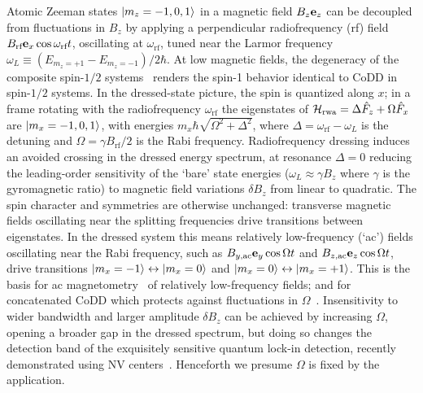 \documentclass[aps,prl,reprint,superscriptaddress,floatfix]{revtex4-1}
\begin{document}
Atomic Zeeman states $\vert m_z=-1,0,1 \rangle $ in a magnetic field $B_z \mathbf{e}_z$ can be decoupled from fluctuations in $B_z$ by applying a perpendicular radiofrequency (rf) field $B_{\text{rf}} \mathbf{e}_x \cos \omega_\text{rf} t$, oscillating at $\omega_\text{rf}$, tuned near the Larmor frequency $\omega_L \equiv (E_{m_z=+1}-E_{m_z=-1})/2\hbar$.
At low magnetic fields, the degeneracy of the composite spin-$1/2$ systems~\cite{majorana_atomi_1932} renders the spin-1 behavior identical to CoDD in spin-$1/2$ systems.
In the dressed-state picture, the spin is quantized along $x$; in a frame rotating with the radiofrequency $\omega_{\text{rf}}$ the eigenstates of $\mathcal{H}_{\text{rwa}} = \Delta \hat{F}_z + \Omega \hat{F}_x$ are $\vert m_x=-1,0,1 \rangle $, with energies $m_x \hbar \sqrt{\Omega^2 + \Delta^2}$, where $\Delta = \omega_{\text{rf}}-\omega_L$ is the detuning and $\Omega = \gamma B_{\text{rf}} / 2$ is the Rabi frequency.
Radiofrequency dressing induces an avoided crossing in the dressed energy spectrum, at resonance $\Delta=0$ reducing the leading-order sensitivity of the `bare' state energies ($\omega_L \approx \gamma B_z$ where $\gamma$ is the gyromagnetic ratio) to magnetic field variations $\delta B_z$ from linear to quadratic.
The spin character and symmetries are otherwise unchanged: transverse magnetic fields oscillating near the splitting frequencies drive transitions between eigenstates.
In the dressed system this means relatively low-frequency (`ac') fields oscillating near the Rabi frequency, such as $B_{y,\text{ac}} \mathbf{e}_y \cos \Omega t$ and $B_{z,\text{ac}} \mathbf{e}_z \cos \Omega t$, drive transitions $\vert m_x=-1 \rangle  \leftrightarrow \vert m_x=0 \rangle $ and $\vert m_x=0 \rangle  \leftrightarrow \vert m_x=+1 \rangle $.
This is the basis for ac magnetometry~\cite{hirose_continuous_2012} of relatively low-frequency fields; and for concatenated CoDD which protects against fluctuations in $\Omega$~\cite{cai_robust_2012}.
Insensitivity to wider bandwidth and larger amplitude $\delta B_z$ can be achieved by increasing $\Omega$, opening a broader gap in the dressed spectrum, but doing so changes the detection band of the exquisitely sensitive quantum lock-in detection, recently demonstrated using NV centers~\cite{boss_quantum_2017,*schmitt_submillihertz_2017}.
Henceforth we presume $\Omega$ is fixed by the application.
\end{document}
